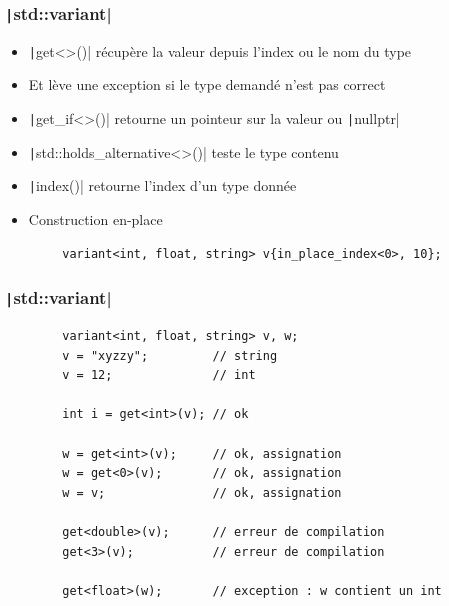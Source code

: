 \documentclass[C++.tex]{subfiles}
\begin{document}
\begin{frame}[fragile]
	\frametitle{\texttt|std::variant|}
	\begin{itemize}
		\item \texttt|get<>()| récupère la valeur depuis l'index ou le nom du type
		\item Et lève une exception si le type demandé n'est pas correct
		\item \texttt|get_if<>()| retourne un pointeur sur la valeur ou \texttt|nullptr|
		\item \texttt|std::holds_alternative<>()| teste le type contenu
		\item \texttt|index()| retourne l'index d'un type donnée
		\item Construction en-place
	\end{itemize}

	\begin{verbatim}
		variant<int, float, string> v{in_place_index<0>, 10};
	\end{verbatim}
\end{frame}

\begin{frame}[fragile]
	\frametitle{\texttt|std::variant|}
	\begin{verbatim}
		variant<int, float, string> v, w;
		v = "xyzzy";         // string
		v = 12;              // int

		int i = get<int>(v); // ok

		w = get<int>(v);     // ok, assignation
		w = get<0>(v);       // ok, assignation
		w = v;               // ok, assignation

		get<double>(v);      // erreur de compilation
		get<3>(v);           // erreur de compilation

		get<float>(w);       // exception : w contient un int
	\end{verbatim}
\end{frame}
\end{document}
